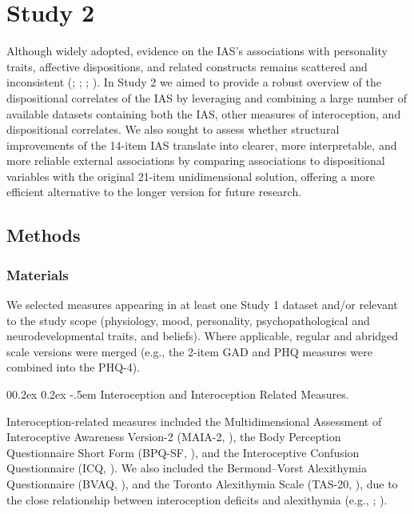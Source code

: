 \documentclass[
  jou,
  floatsintext,
  longtable,
  nolmodern,
  notxfonts,
  notimes,
  colorlinks=true,linkcolor=blue,citecolor=blue,urlcolor=blue]{apa7}
\makeatletter
\renewcommand{\paragraph}{\@startsection{paragraph}{4}{\parindent}%
	{0\baselineskip \@plus 0.2ex \@minus 0.2ex}%
	{-.5em}%
	{\normalfont\normalsize\bfseries\typesectitle}}
\makeatother
\begin{document}
\section{Study 2}\label{study-2}

Although widely adopted, evidence on the IAS's associations with
personality traits, affective dispositions, and related constructs
remains scattered and inconsistent (; ;
;
). In Study 2 we aimed to
provide a robust overview of the dispositional correlates of the IAS by
leveraging and combining a large number of available datasets containing
both the IAS, other measures of interoception, and dispositional
correlates. We also sought to assess whether structural improvements of
the 14-item IAS translate into clearer, more interpretable, and more
reliable external associations by comparing associations to
dispositional variables with the original 21-item unidimensional
solution, offering a more efficient alternative to the longer version
for future research.

\subsection{Methods}\label{methods-1}

\subsubsection{Materials}\label{materials}

We selected measures appearing in at least one Study 1 dataset and/or
relevant to the study scope (physiology, mood, personality,
psychopathological and neurodevelopmental traits, and beliefs). Where
applicable, regular and abridged scale versions were merged (e.g., the
2-item GAD and PHQ measures were combined into the PHQ-4).

\paragraph{Interoception and Interoception Related
Measures.}\label{interoception-and-interoception-related-measures}

Interoception-related measures included the Multidimensional Assessment
of Interoceptive Awareness Version-2 (MAIA-2,
), the
Body Perception Questionnaire Short Form (BPQ-SF,
), and the
Interoceptive Confusion Questionnaire (ICQ,
). We also
included the Bermond--Vorst Alexithymia Questionnaire (BVAQ,
), and the
Toronto Alexithymia Scale (TAS-20, ), due to the close relationship between interoception
deficits and alexithymia (e.g.,
;
).
\end{document}
